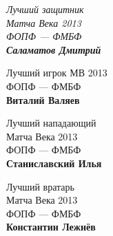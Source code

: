 \documentclass[10pt]{article}
\begin{document}
\pagestyle{empty}

\pagestyle{empty}

\it \centering \large
Лучший защитник \\
Матча Века 2013 \\
ФОПФ --- ФМБФ \\
\smallskip
\textbf{Саламатов Дмитрий} \\
\bigskip\smallskip

\bigskip\smallskip
Лучший игрок 
МВ 2013 \\
ФОПФ --- ФМБФ \\
\smallskip
\large{\textbf{Виталий Валяев} \\}
\bigskip\smallskip

\bigskip\smallskip
Лучший нападающий \\
Матча Века 2013 \\
ФОПФ --- ФМБФ \\
\smallskip
\large{\textbf{Станиславский Илья} \\}
\bigskip\smallskip

\bigskip\smallskip
Лучший вратарь \\
Матча Века 2013 \\
ФОПФ --- ФМБФ \\
\smallskip
\large{\textbf{Константин Лежнёв} \\}
\bigskip\smallskip
\end{document}
